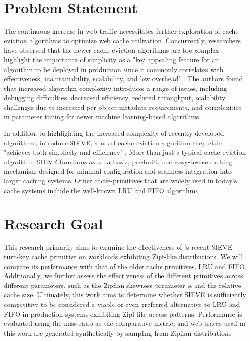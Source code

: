 \section{Problem Statement}


The continuous increase in web traffic \cite{digital-global-report} necessitates further exploration of cache eviction algorithms to optimize web cache utilization. Concurrently, researchers have observed that the newer cache eviction algorithms are too complex \cite{sieve, s3-fifo}. \citeauthor{sieve} \cite{sieve} highlight the importance of simplicity as a "key appealing feature for an algorithm to be deployed in production since it commonly correlates with effectiveness, maintainability, scalability, and low overhead" \cite{sieve}. The authors found that increased algorithm complexity introduces a range of issues, including debugging difficulties, decreased efficiency, reduced throughput, scalability challenges due to increased per-object metadata requirements, and complexities in parameter tuning for newer machine learning-based algorithms.

In addition to highlighting the increased complexity of recently developed algorithms, \citeauthor{sieve} introduce SIEVE, a novel cache eviction algorithm they claim "achieves both simplicity and efficiency" \cite{sieve}. More than just a typical cache eviction algorithm, SIEVE functions as a : a basic, pre-built, and easy-to-use caching mechanism designed for minimal configuration and seamless integration into larger caching systems. Other cache-primitives that are widely used in today's cache systems include the well-known LRU and FIFO algorithms \cite{sieve, s3-fifo}.


\section{Research Goal}\label{sec: research_q}


This research primarily aims to examine the effectiveness of \citeauthor{sieve}'s \cite{sieve} recent SIEVE turn-key cache primitive on workloads exhibiting Zipf-like distributions. We will compare its performance with that of the older cache primitives, LRU and FIFO. Additionally, we further assess the effectiveness of the different primitives across different parameters, such as the Zipfian skewness parameter $\alpha$ and the relative cache size. Ultimately, this work aims to determine whether SIEVE is sufficiently competitive to be considered a viable or even preferred alternative to LRU and FIFO in production systems exhibiting Zipf-like access patterns. Performance is evaluated using the miss ratio as the comparative metric, and web traces used in this work are generated synthetically by sampling from Zipfian distributions.


